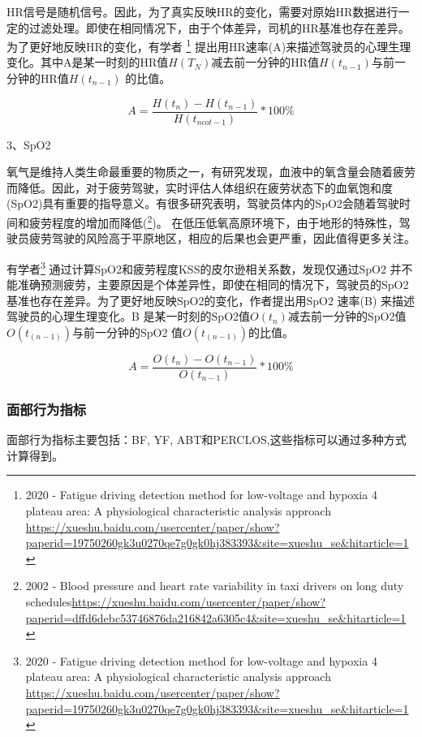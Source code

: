 HR信号是随机信号。因此，为了真实反映HR的变化，需要对原始HR数据进行一定的过滤处理。即使在相同情况下，由于个体差异，司机的HR基准也存在差异。为了更好地反映HR的变化，有学者
\footnote{2020 - Fatigue driving detection method for low-voltage and hypoxia 4 plateau area: A physiological characteristic analysis approach \quad \url{https://xueshu.baidu.com/usercenter/paper/show?paperid=19750260gk3u0270qe7g0gk0hj383393&site=xueshu_se&hitarticle=1}} 提出用HR速率(A)来描述驾驶员的心理生理变化。其中A是某一时刻的HR值$H(T_N)$减去前一分钟的HR值$H(t_{n-1})$与前一分钟的HR值$H(t_{n-1})$ 的比值。

\begin{equation}
A = \frac{{H(t_n)} - H{(t_{n-1})}}{H{(t_{ncot -1})}} * 100 \%
\end{equation}

3、SpO2

氧气是维持人类生命最重要的物质之一，有研究发现，血液中的氧含量会随着疲劳而降低。因此，对于疲劳驾驶，实时评估人体组织在疲劳状态下的血氧饱和度(SpO2)具有重要的指导意义。有很多研究表明，驾驶员体内的SpO2会随着驾驶时间和疲劳程度的增加而降低(\footnote{2002 - Blood pressure and heart rate variability in taxi drivers on long duty schedules\url{https://xueshu.baidu.com/usercenter/paper/show?paperid=dffd6debc53746876da216842a6305c4&site=xueshu_se&hitarticle=1}})。 在低压低氧高原环境下，由于地形的特殊性，驾驶员疲劳驾驶的风险高于平原地区，相应的后果也会更严重，因此值得更多关注。

有学者\footnote{2020 - Fatigue driving detection method for low-voltage and hypoxia
4 plateau area: A physiological characteristic analysis approach \quad \url{https://xueshu.baidu.com/usercenter/paper/show?paperid=19750260gk3u0270qe7g0gk0hj383393&site=xueshu_se&hitarticle=1}} 通过计算SpO2和疲劳程度KSS的皮尔逊相关系数，发现仅通过SpO2 并不能准确预测疲劳，主要原因是个体差异性，即使在相同的情况下，驾驶员的SpO2基准也存在差异。为了更好地反映SpO2的变化，作者提出用SpO2 速率(B) 来描述驾驶员的心理生理变化。B 是某一时刻的SpO2值$O(t_n)$减去前一分钟的SpO2值$O(t_(n-1))$与前一分钟的SpO2 值$O(t_(n-1))$的比值。

\begin{equation}
A = \frac{{O(t_n)} - O{(t_{n-1})}}{O{(t_{n -1})}} * 100 \%
\end{equation}


\subsubsection{面部行为指标}

面部行为指标主要包括：BF, YF, ABT和PERCLOS,这些指标可以通过多种方式计算得到。

